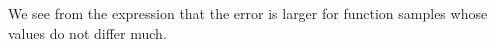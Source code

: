 We see from the expression that the error is larger for function samples whose values do not differ much. 


%
%
%




